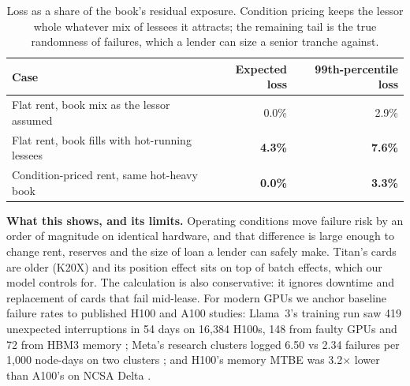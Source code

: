 \documentclass[10pt]{article}
\begin{document}
\begin{table}[h]
\centering\small
\begin{tabularx}{\linewidth}{Xrr}
\toprule
Case & Expected loss & 99th-percentile loss \\
\midrule
Flat rent, book mix as the lessor assumed & 0.0\% & 2.9\% \\
Flat rent, book fills with hot-running lessees & \textcolor{hot}{\textbf{4.3\%}} & \textcolor{hot}{\textbf{7.6\%}} \\
Condition-priced rent, same hot-heavy book & \textbf{0.0\%} & \textbf{3.3\%} \\
\bottomrule
\end{tabularx}
\caption{Loss as a share of the book's residual exposure. Condition pricing keeps the lessor whole whatever mix of lessees it attracts; the remaining tail is the true randomness of failures, which a lender can size a senior tranche against.}
\label{tab:loss}
\end{table}

\textbf{What this shows, and its limits.} Operating conditions move failure risk by an order of magnitude on identical hardware, and that difference is large enough to change rent, reserves and the size of loan a lender can safely make. Titan's cards are older (K20X) and its position effect sits on top of batch effects, which our model controls for. The calculation is also conservative: it ignores downtime and replacement of cards that fail mid-lease. For modern GPUs we anchor baseline failure rates to published H100 and A100 studies: Llama~3's training run saw 419 unexpected interruptions in 54 days on 16,384 H100s, 148 from faulty GPUs and 72 from HBM3 memory \cite{llama3}; Meta's research clusters logged 6.50 vs 2.34 failures per 1,000 node-days on two clusters \cite{kokolis}; and H100's memory MTBE was 3.2$\times$ lower than A100's on NCSA Delta \cite{cui}.
\end{document}
